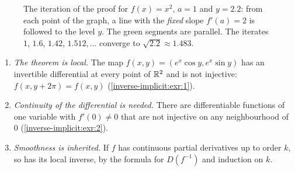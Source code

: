 \begin{notechapter}
\begin{figure}[ht]
\centering
{}
\caption{The iteration of the proof for $f(x) = x^2$, $a = 1$ and
$y = 2.2$: from each point of the graph, a line with the \emph{fixed}
slope $f'(a) = 2$ is followed to the level $y$. The green segments are
parallel. The iterates $1$, $1.6$, $1.42$, $1.512,\dots$ converge to
$\sqrt{2.2}\approx1.483$.}
\label{inverse-implicit:fig:chord}
\end{figure}

\begin{remark}\label{inverse-implicit:rem:remarks}
\begin{enumerate}[nosep]
  \item \emph{The theorem is local.} The map
        $f(x, y) = (e^x\cos y, e^x\sin y)$ has an invertible differential
        at every point of $\mathbb{R}^2$ and is not injective:
        $f(x, y + 2\pi) = f(x, y)$ (\cref{inverse-implicit:exr:1}).
  \item \emph{Continuity of the differential is needed.} There are
        differentiable functions of one variable with $f'(0)\neq0$ that
        are not injective on any neighbourhood of $0$
        (\cref{inverse-implicit:exr:2}).
  \item \emph{Smoothness is inherited.} If $f$ has continuous partial
        derivatives up to order $k$, so has its local inverse, by the
        formula for $D(f^{-1})$ and induction on $k$.
\end{enumerate}
\end{remark}


\end{notechapter}
